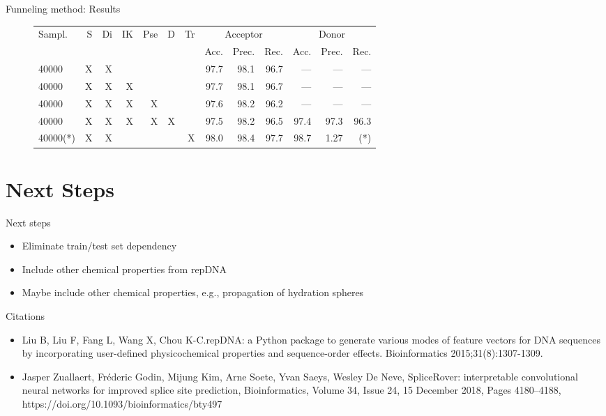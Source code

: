 \documentclass[10pt]{beamer}
\begin{document}
\begin{frame}{Funneling method: Results}
	\begin{figure}
		\scriptsize
		\centering
		\begingroup
		\def\arraystretch{1.2}
		\begin{tabular}{|l|r|r|r|r|r|r|r|r|r|r|r|r|}
			\hline
			 Sampl. & S&Di & IK & Pse & D & Tr &\multicolumn{3}{c|}{Acceptor} & \multicolumn{3}{c|}{Donor} \\
			\cline{8-13}
			&&&&&&& Acc. & Prec. & Rec. & Acc. & Prec. & Rec. \\
			\hline
			40000&X & X &&&& & 97.7 & 98.1 & 96.7 & --- & --- & --- \\
			\hline
			40000&X & X & X & & & & 97.7 & 98.1 & 96.7 & --- & --- & --- \\
			\hline
			40000&X & X & X & X &&  & 97.6 & 98.2 & 96.2 & --- & --- & --- \\
			\hline
			40000&X & X & X & X & X &  & 97.5 & 98.2 & 96.5 & 97.4 & 97.3 & 96.3 \\
			\hline
			40000(*) & X & X & &&&X & 98.0 & 98.4 & 97.7 & 98.7 & 1.27 & (*) \\
			
			
			
			\hline  
		\end{tabular}
		\endgroup
	\end{figure}
\end{frame}

\section{Next Steps}
\begin{frame}{Next steps}
	\begin{itemize}
		\item Eliminate train/test set dependency
		\item Include other chemical properties from repDNA
		\item Maybe include other chemical properties, e.g., propagation of hydration spheres 
	\end{itemize}
\end{frame}

\begin{frame}{Citations}
	\footnotesize
	\begin{itemize}
		\item Liu B, Liu F, Fang L, Wang X, Chou K-C.repDNA: a Python package to generate various modes of feature vectors for DNA sequences by incorporating user-defined physicochemical properties and sequence-order effects. Bioinformatics 2015;31(8):1307-1309.
		\item Jasper Zuallaert, Fréderic Godin, Mijung Kim, Arne Soete, Yvan Saeys, Wesley De Neve, SpliceRover: interpretable convolutional neural networks for improved splice site prediction, Bioinformatics, Volume 34, Issue 24, 15 December 2018, Pages 4180–4188, https://doi.org/10.1093/bioinformatics/bty497
	\end{itemize}
\end{frame}
\end{document}
